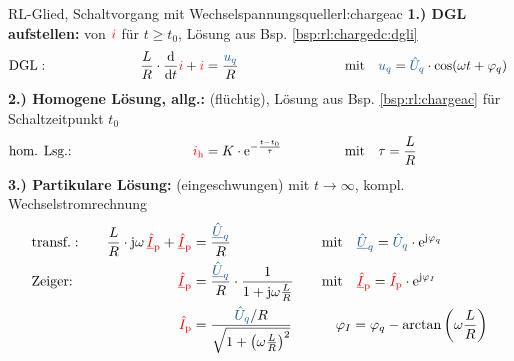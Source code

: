 {\begin{bsp}{RL-Glied, Schaltvorgang mit Wechselspannungsquelle}{rl:chargeac}
        \textbf{1.) DGL aufstellen:} von ${\color{red}i}$ für $t \geq t_0$, Lösung aus Bsp. \ref{bsp:rl:chargedc:dgli}
        \begin{align*}
            &\text{DGL}:&&&
                \frac{L}{R} \cdot \frac{\mathrm{d}}{\mathrm{d}t} \eci{i}  + \eci{i}   &= \frac{\ecv{u_q}}{R}&&&
                &\text{mit}\quad \ecv{u_q} = \ecv{\hat{U}_q} \cdot \cos(\omega t + \varphi_q)
            \\[-15pt]&\hphantom{R1oooooooooo}&&&\hphantom{L3ooooooooooo}&\hphantom{R3ooooooooooooooo}&&&&\hphantom{R5ooooooooooooooooooooooo}\nonumber%
        \end{align*}%
        \textbf{2.) Homogene Lösung, allg.:} (flüchtig), Lösung aus Bsp. \ref{bsp:rl:chargeac} für Schaltzeitpunkt $t_0$
        \begin{align*}
            &\text{hom. Lsg.:} &&&
                \eci{i_{\mathrm{h}}}&= K \cdot \mathrm{e}^{-\frac{t-t_0}{\tau}} &&&
                &\text{mit}\quad \tau = \frac{L}{R}
            \\[-15pt]&\hphantom{R1oooooooooo}&&&\hphantom{L3ooooooooooo}&\hphantom{R3ooooooooooooooo}&&&&\hphantom{R5ooooooooooooooooooooooo}\nonumber%
        \end{align*}%
        \textbf{3.) Partikulare Lösung:} (eingeschwungen) mit $t \to \infty$, kompl. Wechselstromrechnung%
        \begin{align*}%
                &\text{transf.}:&&&
                \frac{L}{R} \cdot \mathrm{j}\omega\, \eci{\underline{\hat{I}}_{\mathrm p}} + \eci{\underline{\hat{I}}_{\mathrm p}} &= \frac{\ecv{\underline{\hat{U}}_q}}{R} &&&
                    &\text{mit}\quad \ecv{\underline{\hat{U}}_q}=\ecv{\hat{U}_q} \cdot \mathrm{e}^{\mathrm{j}\varphi_q}\\
                &\text{Zeiger:}&&&
                    \eci{\underline{\hat{I}}_{\mathrm p}} &= \frac{\ecv{\underline{\hat{U}}_q}}{R} \cdot \frac{1}{1 + \mathrm{j} \omega \frac{L}{R}} &&&
                    &\text{mit}\quad \eci{\underline{\hat{I}}_{\mathrm p}} = \eci{\hat{I}_{\mathrm p}}\cdot\mathrm{e}^{\mathrm{j}\varphi_I}\\
                &&&&
                    \eci{\hat{I}_{\mathrm p}} &=  \frac{\ecv{\hat{U}_q}/R}{\sqrt{1 + \left(\omega \frac{L}{R}\right)^2}} &&&
                    &\quad \varphi_I = \varphi_q - \arctan\left(\omega \frac{L}{R}\right) \\

\end{align*}
\end{bsp}}
